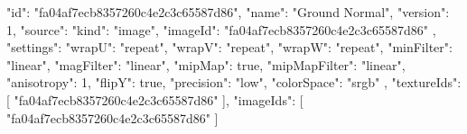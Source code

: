 {
  "id": "fa04af7ecb8357260c4e2c3c65587d86",
  "name": "Ground Normal",
  "version": 1,
  "source": {
    "kind": "image",
    "imageId": "fa04af7ecb8357260c4e2c3c65587d86"
  },
  "settings": {
    "wrapU": "repeat",
    "wrapV": "repeat",
    "wrapW": "repeat",
    "minFilter": "linear",
    "magFilter": "linear",
    "mipMap": true,
    "mipMapFilter": "linear",
    "anisotropy": 1,
    "flipY": true,
    "precision": "low",
    "colorSpace": "srgb"
  },
  "textureIds": [
    "fa04af7ecb8357260c4e2c3c65587d86"
  ],
  "imageIds": [
    "fa04af7ecb8357260c4e2c3c65587d86"
  ]
}
